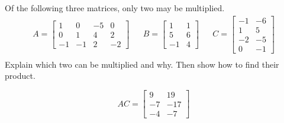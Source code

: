 
\begin{exerciseStatement}


Of the following three matrices, only two may be multiplied. 
\begin{align*} A= \left[\begin{array}{cccc}
1 & 0 & -5 & 0 \\
0 & 1 & 4 & 2 \\
-1 & -1 & 2 & -2
\end{array}\right]  & & B= \left[\begin{array}{cc}
1 & 1 \\
5 & 6 \\
-1 & 4
\end{array}\right]  & & C= \left[\begin{array}{cc}
-1 & -6 \\
1 & 5 \\
-2 & -5 \\
0 & -1
\end{array}\right]  \\ \end{align*}
             Explain which two can be multiplied and why. Then show how to find their product.


\end{exerciseStatement}
    
\begin{exerciseAnswer} 
\[AC= \left[\begin{array}{cc}
9 & 19 \\
-7 & -17 \\
-4 & -7
\end{array}\right] \]
\end{exerciseAnswer}
    
